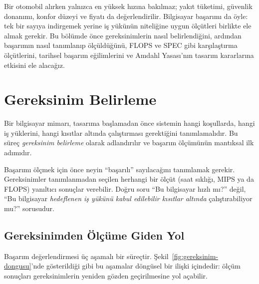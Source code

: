 Bir otomobil alırken yalnızca en yüksek hızına bakılmaz; yakıt tüketimi, güvenlik donanımı, konfor düzeyi ve fiyatı da değerlendirilir. Bilgisayar başarımı da öyle: tek bir sayıya indirgemek yerine iş yükünün niteliğine uygun ölçütleri birlikte ele almak gerekir. Bu bölümde önce gereksinimlerin nasıl belirlendiğini, ardından başarımın nasıl tanımlanıp ölçüldüğünü, FLOPS ve SPEC gibi karşılaştırma ölçütlerini, tarihsel başarım eğilimlerini ve Amdahl Yasası'nın tasarım kararlarına etkisini ele alacağız.


\section{Gereksinim Belirleme}
\label{sec:gereksinim-belirleme}

Bir bilgisayar mimarı, tasarıma başlamadan önce sistemin hangi koşullarda, hangi iş yüklerini, hangi kısıtlar altında çalıştırması gerektiğini tanımlamalıdır. Bu süreç \emph{gereksinim belirleme} olarak adlandırılır ve başarım ölçümünün mantıksal ilk adımıdır.

\begin{tanim}
Başarımı ölçmek için önce neyin ``başarılı'' sayılacağını tanımlamak gerekir. Gereksinimler tanımlanmadan seçilen herhangi bir ölçüt (saat sıklığı, MIPS ya da FLOPS) yanıltıcı sonuçlar verebilir. Doğru soru ``Bu bilgisayar hızlı mı?'' değil, ``Bu bilgisayar \emph{hedeflenen iş yükünü kabul edilebilir kısıtlar altında} çalıştırabiliyor mu?'' sorusudur.
\end{tanim}


\subsection{Gereksinimden Ölçüme Giden Yol}
\label{subsec:gereksinimden-olcume}

Başarım değerlendirmesi üç aşamalı bir süreçtir. Şekil~\ref{fig:gereksinim-dongusu}'nde gösterildiği gibi bu aşamalar döngüsel bir ilişki içindedir: ölçüm sonuçları gereksinimlerin yeniden gözden geçirilmesine yol açabilir.

